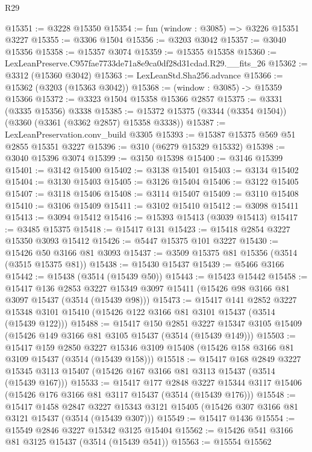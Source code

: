 \begin{lexlean}{R29}
\begin{coremodule}
@15351 := @3228 @15350
@15354 := fun (window : @3085) => @3226 @15351 @3227
@15355 := @3306 @1504
@15356 := @3203 @3042
@15357 := @3040 @15356
@15358 := @15357 @3074
@15359 := @15355 @15358
@15360 := LexLeanPreserve.C957fae7733de71a8e9ca0df28d31cdad.R29.__fits_26
@15362 := @3312 (@15360 @3042)
@15363 := LexLeanStd.Sha256.advance
@15366 := @15362 (@3203 (@15363 @3042))
@15368 := (window : @3085) -> @15359 @15366
@15372 := @3323 @1504 @15358 @15366 @2857
@15375 := @3331 (@3335 @15356) @3338
@15385 := @15372 @15375 (@3344 (@3354 @1504)) (@3360 (@3361 (@3362 @2857) @15358 @3338))
@15387 := LexLeanPreservation.conv_build @3305
@15393 := @15387 @15375 @569 @51 @2855 @15351 @3227
@15396 := @310 (@6279 @15329 @15332)
@15398 := @3040 @15396 @3074
@15399 := @3150 @15398
@15400 := @3146 @15399
@15401 := @3142 @15400
@15402 := @3138 @15401
@15403 := @3134 @15402
@15404 := @3130 @15403
@15405 := @3126 @15404
@15406 := @3122 @15405
@15407 := @3118 @15406
@15408 := @3114 @15407
@15409 := @3110 @15408
@15410 := @3106 @15409
@15411 := @3102 @15410
@15412 := @3098 @15411
@15413 := @3094 @15412
@15416 := @15393 @15413 (@3039 @15413)
@15417 := @3485 @15375
@15418 := @15417 @131
@15423 := @15418 @2854 @3227 @15350 @3093 @15412
@15426 := @5447 @15375 @101 @3227
@15430 := @15426 @50 @3166 @81 @3093
@15437 := @3509 @15375 @81 @15356 (@3514 (@3515 @15375 @81))
@15438 := @15430 @15437
@15439 := @5466 @3166
@15442 := @15438 (@3514 (@15439 @50))
@15443 := @15423 @15442
@15458 := @15417
    @136
    @2853
    @3227
    @15349
    @3097
    @15411
    (@15426 @98 @3166 @81 @3097 @15437 (@3514 (@15439 @98)))
@15473 := @15417
    @141
    @2852
    @3227
    @15348
    @3101
    @15410
    (@15426 @122 @3166 @81 @3101 @15437 (@3514 (@15439 @122)))
@15488 := @15417
    @150
    @2851
    @3227
    @15347
    @3105
    @15409
    (@15426 @149 @3166 @81 @3105 @15437 (@3514 (@15439 @149)))
@15503 := @15417
    @159
    @2850
    @3227
    @15346
    @3109
    @15408
    (@15426 @158 @3166 @81 @3109 @15437 (@3514 (@15439 @158)))
@15518 := @15417
    @168
    @2849
    @3227
    @15345
    @3113
    @15407
    (@15426 @167 @3166 @81 @3113 @15437 (@3514 (@15439 @167)))
@15533 := @15417
    @177
    @2848
    @3227
    @15344
    @3117
    @15406
    (@15426 @176 @3166 @81 @3117 @15437 (@3514 (@15439 @176)))
@15548 := @15417
    @1458
    @2847
    @3227
    @15343
    @3121
    @15405
    (@15426 @307 @3166 @81 @3121 @15437 (@3514 (@15439 @307)))
@15549 := @15417 @1436
@15554 := @15549 @2846 @3227 @15342 @3125 @15404
@15562 := @15426 @541 @3166 @81 @3125 @15437 (@3514 (@15439 @541))
@15563 := @15554 @15562

\end{coremodule}
\end{lexlean}
